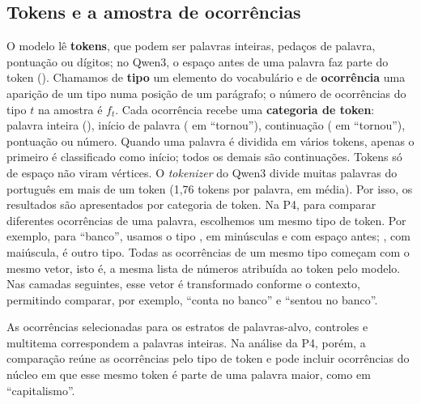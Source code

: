 \subsection{Tokens e a amostra de ocorrências}\label{sec:amostra}

O modelo lê \textbf{tokens}, que podem ser palavras inteiras, pedaços de palavra, pontuação
ou dígitos; no Qwen3, o espaço antes de uma palavra faz parte do token ().
Chamamos de \textbf{tipo} um elemento do vocabulário e de \textbf{ocorrência} uma aparição de
um tipo numa posição de um parágrafo; o número de ocorrências do tipo $t$ na amostra é $f_t$.
Cada ocorrência recebe uma \textbf{categoria de token}: palavra inteira (),
início de palavra ( em ``tornou''), continuação ( em ``tornou''),
pontuação ou número. 
Quando uma palavra é dividida em vários tokens, apenas o primeiro é classificado como início; todos os demais são continuações. 
Tokens só de espaço não viram vértices. O \emph{tokenizer} do Qwen3 divide muitas palavras do
português em mais de um token (1,76 tokens por palavra, em média). Por isso, os resultados
são apresentados por categoria de token. Na P4, para comparar diferentes ocorrências de uma
palavra, escolhemos um mesmo tipo de token. Por exemplo, para ``banco'', usamos o tipo
, em minúsculas e com espaço antes; , com maiúscula, é outro
tipo. Todas as ocorrências de um mesmo tipo começam com o mesmo vetor, isto é, a mesma lista
de números atribuída ao token pelo modelo. Nas camadas seguintes, esse vetor é transformado
conforme o contexto, permitindo comparar, por exemplo, ``conta no banco'' e ``sentou no banco''.

As ocorrências selecionadas para os estratos de palavras-alvo, controles e multitema
correspondem a palavras inteiras. Na análise da P4, porém, a comparação reúne as ocorrências
pelo tipo de token e pode incluir ocorrências do núcleo em que esse mesmo token é parte de uma
palavra maior, como  em ``capitalismo''.

